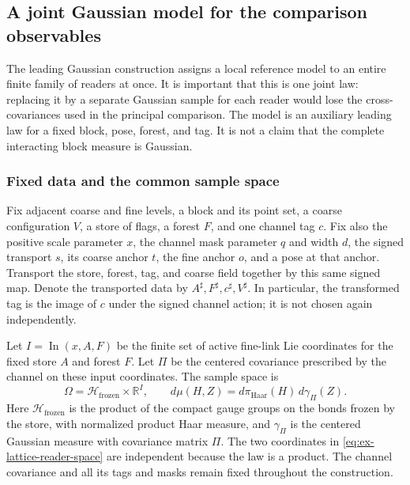 \subsection{A joint Gaussian model for the comparison observables}
\label{sec:ex-lattice-all-arity-reader-gaussian-model}

The leading Gaussian construction assigns a local reference model to an
entire finite family of readers at once. It is important that this is one
joint law: replacing it by a separate Gaussian sample for each reader would
lose the cross-covariances used in the principal comparison. The model is an
auxiliary leading law for a fixed block, pose, forest, and tag. It is not a
claim that the complete interacting block measure is Gaussian.

\subsubsection{Fixed data and the common sample space}

Fix adjacent coarse and fine levels, a block and its point set, a coarse
configuration $V$, a store of flags, a forest $F$, and one channel tag $c$.
Fix also the positive scale parameter $x$, the channel mask parameter $q$
and width $d$, the signed transport
$s$, its coarse anchor $t$, the fine anchor $o$, and a pose at that anchor.
Transport the store, forest, tag, and
coarse field together by this same signed map. Denote the transported data
by $A^\sharp,F^\sharp,c^\sharp,V^\sharp$. In particular, the transformed
tag is the image of $c$ under the signed channel action; it is not chosen
again independently.

Let $I=\operatorname{In}(x,A,F)$ be the finite set of active fine-link Lie
coordinates for the fixed store $A$ and forest $F$. Let $\Pi$ be the
centered covariance prescribed by the channel on these input coordinates.
The sample space is
\begin{equation}
 \Omega=\mathcal H_{\mathrm{frozen}}\times\mathbb R^I,
 \qquad
 d\mu(H,Z)=d\pi_{\mathrm{Haar}}(H)\,d\gamma_{\Pi}(Z).
 \label{eq:ex-lattice-reader-space}
\end{equation}
Here $\mathcal H_{\mathrm{frozen}}$ is the product of the compact gauge
groups on the bonds frozen by the store, with normalized product Haar
measure, and $\gamma_\Pi$ is the centered Gaussian measure with covariance
matrix $\Pi$. The two coordinates in \eqref{eq:ex-lattice-reader-space} are independent because the law
is a product. The channel covariance and all its tags and masks remain fixed
throughout the construction.

